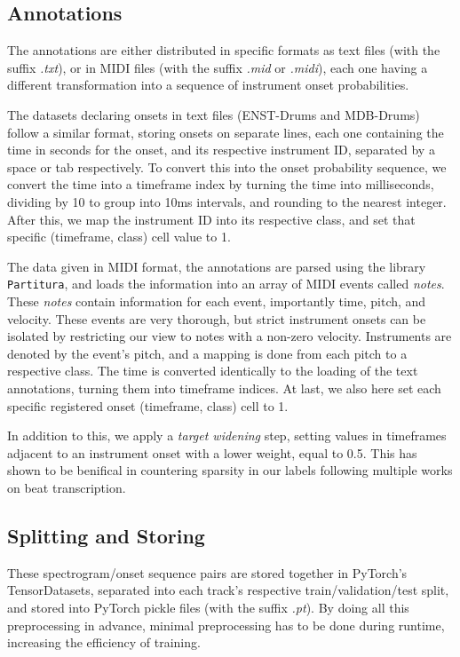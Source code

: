\subsection{Annotations}

The annotations are either distributed in specific formats as text files (with the suffix \textit{.txt}), or in MIDI files (with the suffix \textit{.mid} or \textit{.midi}), each one having a different transformation into a sequence of instrument onset probabilities.

The datasets declaring onsets in text files (ENST-Drums and MDB-Drums) follow a similar format, storing onsets on separate lines, each one containing the time in seconds for the onset, and its respective instrument ID, separated by a space or tab respectively. To convert this into the onset probability sequence, we convert the time into a timeframe index by turning the time into milliseconds, dividing by 10 to group into 10ms intervals, and rounding to the nearest integer. After this, we map the instrument ID into its respective class, and set that specific (timeframe, class) cell value to 1.

The data given in MIDI format, the annotations are parsed using the library \texttt{Partitura}, and loads the information into an array of MIDI events called \textit{notes}. These \textit{notes} contain information for each event, importantly time, pitch, and velocity. These events are very thorough, but strict instrument onsets can be isolated by restricting our view to notes with a non-zero velocity. Instruments are denoted by the event's pitch, and a mapping is done from each pitch to a respective class. The time is converted identically to the loading of the text annotations, turning them into timeframe indices. At last, we also here set each specific registered onset (timeframe, class) cell to 1.

In addition to this, we apply a \textit{target widening} step, setting values in timeframes adjacent to an instrument onset with a lower weight, equal to 0.5. This has shown to be benifical in countering sparsity in our labels following multiple works on beat transcription.~\cite{9747048, signals4040042}

\subsection{Splitting and Storing}

These spectrogram/onset sequence pairs are stored together in PyTorch's TensorDatasets, separated into each track's respective train/validation/test split, and stored into PyTorch pickle files (with the suffix \textit{.pt}). By doing all this preprocessing in advance, minimal preprocessing has to be done during runtime, increasing the efficiency of training.

